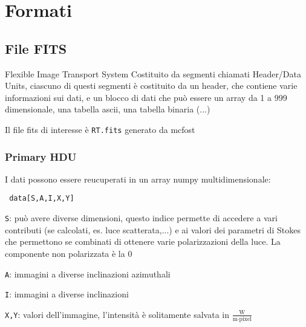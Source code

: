 \documentclass[DIN, pagenumber=false, fontsize=11pt, parskip=half]{scrartcl}
\begin{document}
\section{Formati}

\subsection{File FITS}
Flexible Image Transport System
Costituito da segmenti chiamati Header/Data Units, ciascuno di questi segmenti è costituito da un header, che contiene varie informazioni sui dati, e un blocco di dati che può essere un array da 1 a 999 dimensionale, una tabella ascii, una tabella binaria (...)

Il file fits di interesse è \lstinline{RT.fits} generato da mcfost
\subsubsection{Primary HDU}

I dati possono essere reucuperati in un array numpy multidimensionale:
\begin{lstlisting}
 data[S,A,I,X,Y]
\end{lstlisting}

\lstinline{S}: può avere diverse dimensioni, questo indice permette di accedere a vari contributi (se calcolati, es. luce scatterata,...) e ai valori dei parametri di Stokes che permettono se combinati di ottenere varie polarizzazioni della luce. La componente non polarizzata è la 0

\lstinline{A}: immagini a diverse inclinazioni azimuthali

\lstinline{I}: immagini a diverse inclinazioni

\lstinline{X,Y}: valori dell'immagine, l'intensità è solitamente salvata in $\frac{\text{W}}{\text{m}\cdot \text{pixel}}$
\end{document}
